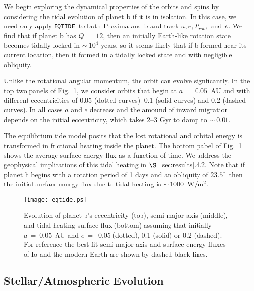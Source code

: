 \documentclass[preprint,12pt]{aastex}
\def\eqtide{\texttt{\footnotesize{EQTIDE}}}
\begin{document}
We begin exploring the dynamical properties of the orbits and spins by
considering the tidal evolution of planet b if it is in isolation. In
this case, we need only apply \eqtide~to both Proxima and b and track
$a, e, P_{rot},$ and $\psi$. We find that if planet b has $Q~=~12$,
then an initially Earth-like rotation state becomes tidally locked in
$\sim~10^4$ years, so it seems likely that if b formed near its
current location, then it formed in a tidally locked state and with
negligible obliquity.

Unlike the rotational angular momentum, the orbit can evolve
signficantly. In the top two panels of Fig.~\ref{fig:eqtide}, we
consider orbits that begin at $a~=~0.05$~AU and with different
eccentricities of 0.05 (dotted curves), 0.1 (solid curves) and 0.2
(dashed curves). In all cases $a$ and $e$ decrease and the amound of
inward migration depends on the initial eccentricity, which takes 2--3
Gyr to damp to $\sim~0.01$.

The equilibrium tide model posits that the lost rotational and orbital
energy is transformed in frictional heating inside the planet. The
bottom pabel of Fig.~\ref{fig:eqtide} shows the average surface energy
flux as a function of time. We address the geophysical implications of
this tidal heating in $\S$~\ref{sec:results}.4.2. Note that if planet
b begins with a rotation period of 1 days and an obliquity of
$23.5^\circ$, then the initial surface energy flux due to tidal
heating is $\sim~1000$~W/m$^{2}$.

\begin{figure} 
\begin{center}
\texttt{[image: eqtide.ps]}
\end{center}
\caption{Evolution of planet b's eccentricity (top), semi-major axis (middle), and tidal heating surface flux (bottom) assuming that initially $a~=~0.05$~AU and $e~=$~0.05 (dotted), 0.1 (solid) or 0.2 (dashed). For reference the best fit semi-major axis and surface energy fluxes of Io and the modern Earth are shown by dashed black lines.}
\label{fig:eqtide}
\end{figure}


\subsection{Stellar/Atmospheric Evolution}
\end{document}
